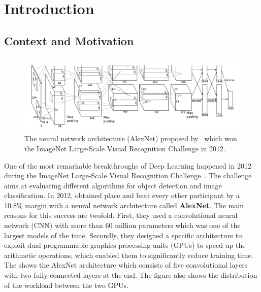 \chapter{Introduction}
\label{chapter:ch1-introduction}
\localtoc

\section{Context and Motivation}
\label{section:ch1-context_and_motivation}

\begin{figure}[t]
  \centering
  \includegraphics[scale=0.2]{figures/main/ch1-introduction/alexnet.png}
  \caption{The neural network architecture (AlexNet) proposed by~\citet{krizhevsky2012imagenet} which won the ImageNet Large-Scale Visual Recognition Challenge in 2012.}
  \label{figure:ch1-alexnet_network}
\end{figure}

One of the most remarkable breakthroughs of Deep Learning happened in 2012 during the ImageNet Large-Scale Visual Recognition Challenge~\cite{russakovsky2015imagenet}.
The challenge aims at evaluating different algorithms for object detection and image classification.
In 2012, \citeauthor{krizhevsky2012imagenet} obtained  place and beat every other participant by a 10.8\% margin with a neural network architecture called \textbf{AlexNet}.
The main reasons for this success are twofold.
First, they used a convolutional neural network (CNN) with more than 60 million parameters which was one of the largest models of the time.
Secondly, they designed a specific architecture to exploit dual programmable graphics processing units (GPUs) to speed up the arithmetic operations, which enabled them to significantly reduce training time.
The  shows the AlexNet architecture which consists of five convolutional layers with two fully connected layers at the end.
The figure also shows the distribution of the workload between the two GPUs.



